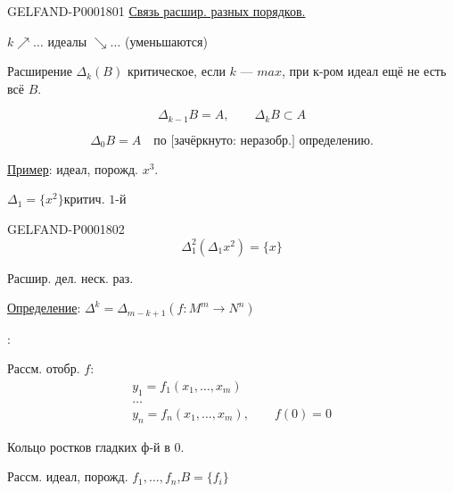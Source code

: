 \begin{GelfandAdjacentEvidence}{GELFAND-P000180}{1}
\underline{Связь расшир. разных порядков.}

$k\nearrow\ldots$ идеалы $\searrow\ldots$ (уменьшаются)

Расширение $\Delta_k(B)$ критическое, если $k$ — $max$, при к-ром идеал ещё не есть всё $B$.

\begin{equation*}\Delta_{k-1}B=A,\qquad\Delta_kB\subset A\end{equation*}

\begin{equation*}\Delta_0B=A\quad\text{по [зачёркнуто: неразобр.] определению.}\end{equation*}
\end{GelfandAdjacentEvidence}

\underline{Пример}: идеал, порожд. $x^3$.

\qquad $\Delta_1=\{x^2\}$\qquad критич. $1$-й

\begin{GelfandAdjacentEvidence}{GELFAND-P000180}{2}
\begin{equation*}\Delta_1^2(\Delta_1x^2)=\{x\}\end{equation*}
\end{GelfandAdjacentEvidence}

Расшир. дел. неск. раз.

\underline{Определение}: $\Delta^k=\Delta_{m-k+1}$\qquad $(f:M^m\longrightarrow N^n)$

\quad{}:

Рассм. отобр. $f$:
\begin{gather*}y_1=f_1(x_1,\ldots,x_m)\\\ldots\\y_n=f_n(x_1,\ldots,x_m),\qquad f(0)=0\end{gather*}

Кольцо ростков гладких ф-й в $0$.

Рассм. идеал, порожд. $f_1,\ldots,f_n$,\qquad $B=\{f_i\}$

